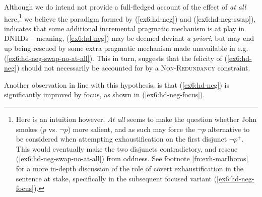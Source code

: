 \begin{exe}
	\ex \label{ex6:hd-neg-swap}
	\begin{xlist}
		\label{ex6:hd-neg-swap-no-at-all}
		\label{ex6:hd-neg-swap-at-all}
	\end{xlist}
\end{exe}

Although we do intend not provide a full-fledged account of the effect of \textit{at all} here,\footnote{Here is an intuition however. \textit{At all} seems to make the question whether John smokes ($p$ vs. $\neg p$) more salient, and as such may force the $\neg p$ alternative to be considered when attempting exhaustification on the first disjunct $\neg p^+$. This would eventually make the two disjuncts contradictory, and rescue (\ref{ex6:hd-neg-swap-no-at-all}) from oddness. See footnote \ref{fn:exh-marlboros} for a more in-depth discussion of the role of covert exhaustification in the sentence at stake, specifically in the subsequent focused variant (\ref{ex6:hd-neg-focus}).}
we believe the paradigm formed by (\ref{ex6:hd-neg}) and (\ref{ex6:hd-neg-swap}), indicates that some additional incremental pragmatic mechanism is at play in DNHDs -- meaning, (\ref{ex6:hd-neg}) may be deemed deviant \textit{a priori}, but may end up being rescued by some extra pragmatic mechanism made unavailable in e.g. (\ref{ex6:hd-neg-swap-no-at-all}). This in turn, suggests that the felicity of (\ref{ex6:hd-neg}) should not necessarily be accounted for by a \textsc{Non-Redundancy} constraint.

Another observation in line with this hypothesis, is that (\ref{ex6:hd-neg}) is significantly improved by focus, as shown in (\ref{ex6:hd-neg-focus}). 


\begin{exe}
	\label{ex6:hd-neg-focus}
\end{exe}

